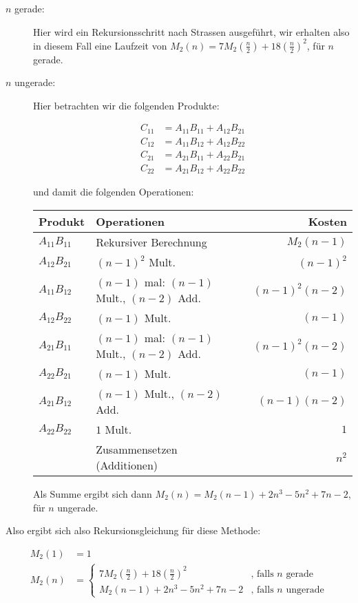 \documentclass[11pt,a4paper,ngerman]{article}
\begin{document}
\begin{description}
\item[$n$ gerade:] Hier wird ein Rekursionsschritt nach Strassen ausgeführt, wir erhalten also in diesem
Fall eine Laufzeit von $M_2(n) = 7M_2(\frac{n}{2}) + 18\left(\frac{n}{2}\right)^2$, für $n$ gerade.
\item[$n$ ungerade:] Hier betrachten wir die folgenden Produkte:

\begin{equation*}\begin{split}
C_{11} &= A_{11}B_{11} + A_{12}B_{21} \\
C_{12} &= A_{11}B_{12} + A_{12}B_{22} \\
C_{21} &= A_{21}B_{11} + A_{22}B_{21} \\
C_{22} &= A_{21}B_{12} + A_{22}B_{22}
\end{split}\end{equation*}

und damit die folgenden Operationen:

\begin{tabular}{l|l||r}
Produkt & Operationen & Kosten \\
\hline \hline
$A_{11}B_{11}$ & Rekursiver Berechnung & $M_2(n-1)$ \\
$A_{12}B_{21}$ & $(n-1)^2$ Mult. & $(n-1)^2$ \\
$A_{11}B_{12}$ & $(n-1)$ mal: $(n-1)$ Mult., $(n-2)$ Add. & $(n-1)^2 (n-2)$ \\
$A_{12}B_{22}$ & $(n-1)$ Mult. & $(n-1)$ \\
$A_{21}B_{11}$ & $(n-1)$ mal: $(n-1)$ Mult., $(n-2)$ Add. & $(n-1)^2 (n-2)$ \\
$A_{22}B_{21}$ & $(n-1)$ Mult. & $(n-1)$ \\
$A_{21}B_{12}$ & $(n-1)$ Mult., $(n-2)$ Add. & $(n-1)(n-2)$ \\
$A_{22}B_{22}$ & $1$ Mult. & $1$ \\
& Zusammensetzen (Additionen)& $n^2$ 
\end{tabular}

Als Summe ergibt sich dann $M_2(n) = M_2(n-1) + 2n^3 -5n^2 +7n -2$, für $n$ ungerade.
\end{description}

Also ergibt sich also Rekursionsgleichung für diese Methode:

\begin{equation*}\begin{split}
M_2(1) &= 1 \\
M_2(n) &= \begin{cases}
            7M_2(\frac{n}{2}) + 18\left(\frac{n}{2}\right)^2 & \text{, falls $n$ gerade} \\
            M_2(n-1) + 2n^3 -5n^2 +7n -2 & \text{, falls $n$ ungerade}
         \end{cases}
\end{split}\end{equation*}
\end{document}
